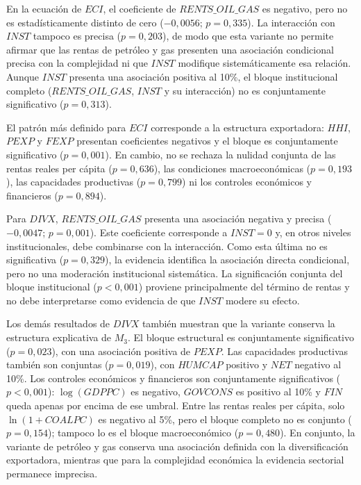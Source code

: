 \documentclass[../../TFM.tex]{subfiles}
\begin{document}
En la ecuación de $ECI$, el coeficiente de $RENTS\_OIL\_GAS$ es negativo, pero
no es estadísticamente distinto de cero ($-0,0056$; $p=0,335$). La interacción
con $INST$ tampoco es precisa ($p=0,203$), de modo que esta variante no permite
afirmar que las rentas de petróleo y gas presenten una asociación condicional
precisa con la complejidad ni que $INST$ modifique sistemáticamente esa relación.
Aunque $INST$ presenta una
asociación positiva al 10\%, el bloque institucional completo
($RENTS\_OIL\_GAS$, $INST$ y su interacción) no es conjuntamente significativo
($p=0,313$).

El patrón más definido para $ECI$ corresponde a la estructura exportadora:
$HHI$, $PEXP$ y $FEXP$ presentan coeficientes negativos y el bloque es
conjuntamente significativo ($p=0,001$). En cambio, no se rechaza la nulidad
conjunta de las rentas reales per cápita ($p=0,636$), las condiciones
macroeconómicas ($p=0,193$), las capacidades productivas ($p=0,799$) ni los
controles económicos y financieros ($p=0,894$).

Para $DIVX$, $RENTS\_OIL\_GAS$ presenta una asociación negativa y precisa
($-0,0047$; $p=0,001$). Este coeficiente corresponde a $INST=0$ y, en otros
niveles institucionales, debe combinarse con la interacción. Como esta última no
es significativa ($p=0,329$), la evidencia identifica la asociación directa
condicional, pero no una moderación institucional sistemática. La significación
conjunta del bloque institucional ($p<0,001$) proviene principalmente del término
de rentas y no debe interpretarse como evidencia de que $INST$ modere su efecto.

Los demás resultados de $DIVX$ también muestran que la variante conserva la
estructura explicativa de $M_3$. El bloque estructural es conjuntamente
significativo ($p=0,023$), con una asociación positiva de $PEXP$. Las capacidades
productivas también son conjuntas ($p=0,019$), con $HUMCAP$ positivo y $NET$
negativo al 10\%. Los controles económicos y financieros son conjuntamente
significativos ($p<0,001$): $\log(GDPPC)$ es negativo, $GOVCONS$ es positivo al
10\% y $FIN$ queda apenas por encima de ese umbral. Entre las rentas reales per
cápita, solo $\ln(1+COALPC)$ es negativo al 5\%, pero el bloque completo no es
conjunto ($p=0,154$); tampoco lo es el bloque macroeconómico ($p=0,480$). En
conjunto, la variante de petróleo y gas conserva una asociación definida con la
diversificación exportadora, mientras que para la complejidad económica la
evidencia sectorial permanece imprecisa.
\end{document}
